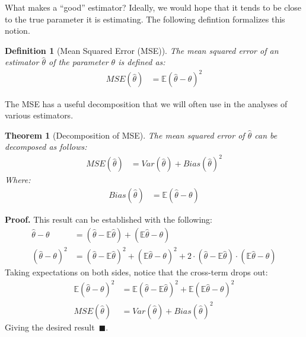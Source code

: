 \documentclass{tufte-handout}
\newtheorem{mydef}{Definition}
\newtheorem{thm}{Theorem}
\begin{document}
What makes a ``good'' estimator? Ideally, we would hope that it tends
to be close to the true parameter it is estimating. The following defintion
formalizes this notion.

\begin{mydef}[Mean Squared Error (MSE)]
The mean squared error of an estimator $\widehat{\theta}$ of the parameter
$\theta$ is defined as:
\begin{align*}
MSE(\widehat{\theta}) &= \mathbb{E} \left( \widehat{\theta} - \theta  \right)^2
\end{align*}
\end{mydef}

The MSE has a useful decomposition that we will often use in the
analyses of various estimators.

\begin{thm}[Decomposition of MSE]
The mean squared error of $\widehat{\theta}$ can be decomposed as
follows:
\begin{align*}
MSE(\widehat{\theta}) &= Var(\widehat{\theta}) + Bias(\widehat{\theta})^2
\end{align*}
Where:
\begin{align*}
Bias(\widehat{\theta}) &= \mathbb{E} (\widehat{\theta} - \theta)
\end{align*}
\end{thm}
\textbf{Proof.} This result can be established with the following:
\begin{align*}
\widehat{\theta} - \theta &= (\widehat{\theta} - \mathbb{E}\widehat{\theta}) +
                              (\mathbb{E}\widehat{\theta} - \theta) \\
(\widehat{\theta} - \theta)^2 &=  (\widehat{\theta} - \mathbb{E}\widehat{\theta})^2 +
                                  (\mathbb{E}\widehat{\theta} - \theta)^2 +
                                  2 \cdot (\widehat{\theta} - \mathbb{E}\widehat{\theta})
                                  \cdot (\mathbb{E}\widehat{\theta} - \theta)
\end{align*}
Taking expectations on both sides, notice that the cross-term drops out:
\begin{align*}
\mathbb{E} (\widehat{\theta} - \theta)^2 &= \mathbb{E} (\widehat{\theta} - \mathbb{E}\widehat{\theta})^2 + \mathbb{E}(\mathbb{E}\widehat{\theta} - \theta)^2 \\
MSE(\widehat{\theta}) &= Var(\widehat{\theta}) + Bias(\widehat{\theta})^2
\end{align*}
Giving the desired result~$\blacksquare$.
\end{document}
